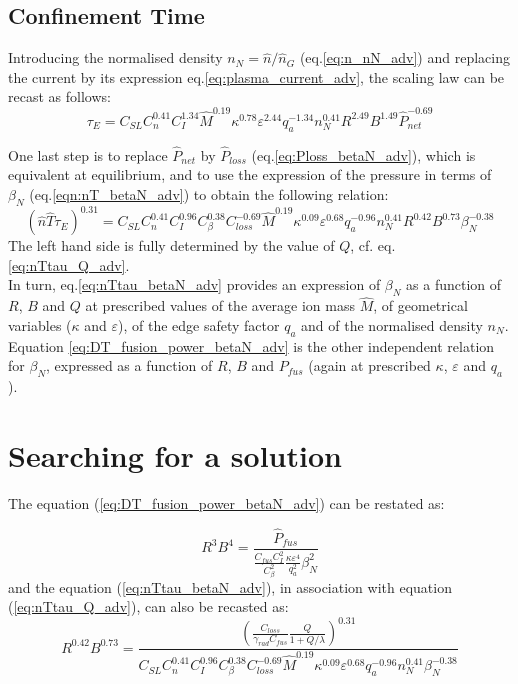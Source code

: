 \subsection{Confinement Time}
Introducing the normalised density $n_N = \hat n/\hat n_G$ (eq.\ref{eq:n_nN_adv}) and replacing the current by its expression eq.\ref{eq:plasma_current_adv}, the scaling law can be recast as follows:
\begin{equation*}
\tau_E = C_{SL} C_n^{0.41} C_I^{1.34} \hat M^{0.19} \kappa^{0.78} \varepsilon^{2.44} q_a^{-1.34}
n_N^{0.41} R^{2.49} B^{1.49} \hat P_{net}^{-0.69}
\end{equation*}

One last step is to replace $\hat P_{net}$ by $\hat P_{loss}$ (eq.\ref{eq:Ploss_betaN_adv}), which is equivalent at equilibrium, and to use the expression of the pressure in terms of $\beta_N$ (eq.\ref{eqn:nT_betaN_adv}) to obtain the following relation:
\begin{equation}
\boxed{
	(\hat n\hat T\tau_E)^{0.31} 
	= 
	C_{SL} C_n^{0.41} C_I^{0.96} C_\beta^{0.38} 
	C_{loss}^{-0.69}
	\hat M^{0.19} \kappa^{0.09} \varepsilon^{0.68} q_a^{-0.96}
	n_N^{0.41} R^{0.42} B^{0.73} \beta_N^{-0.38}
}
\label{eq:nTtau_betaN_adv}
\end{equation}
The left hand side is fully determined by the value of $Q$, cf. eq.\ref{eq:nTtau_Q_adv}. \\

In turn, eq.\ref{eq:nTtau_betaN_adv} provides an expression of $\beta_N$ as a function of $R$, $B$ and $Q$ at prescribed values of the average ion mass $\hat M$, of geometrical variables ($\kappa$ and $\varepsilon$), of the edge safety factor $q_a$ and of the normalised density $n_N$.
Equation \ref{eq:DT_fusion_power_betaN_adv} is the other independent relation for $\beta_N$, expressed as a function of $R$, $B$ and $P_{fus}$ (again at prescribed $\kappa$, $\varepsilon$ and $q_a$).




\section{Searching for a solution}
The equation (\ref{eq:DT_fusion_power_betaN_adv}) can be restated as:

\begin{equation}
	R^3 B^4 
	=
	\frac{
		\hat P_{fus}
	}{
		\frac{C_{fus}C_I^2}{C_\beta^2} \frac{\kappa \varepsilon^4}{q_a^2} 
		\beta_N^2 
	}
\end{equation}
and the equation (\ref{eq:nTtau_betaN_adv}), in association with equation (\ref{eq:nTtau_Q_adv}), can also be recasted as:
\begin{equation}
R^{0.42} B^{0.73}
=
\frac{
	\left( 
		\frac{C_{loss}}{\gamma_{rad} C_{fus}} \frac{Q}{1+Q/\lambda} 
	\right)^{0.31} 
}{
	C_{SL} C_n^{0.41} C_I^{0.96} C_\beta^{0.38} 
C_{loss}^{-0.69}
\hat M^{0.19} \kappa^{0.09} \varepsilon^{0.68} q_a^{-0.96}
n_N^{0.41}  \beta_N^{-0.38}
}
\end{equation}


